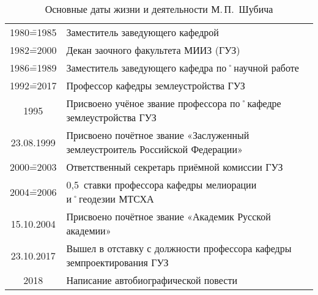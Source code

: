 \begin{table}[tH]
{\begin{tabularx}{\textwidth}{cX}
		1980\==1985		&	Заместитель заведующего кафедрой													\\
		1982\==2000		&	Декан заочного факультета МИИЗ (ГУЗ)												\\
		1986\==1989		&	Заместитель заведующего кафедра по˚научной работе									\\
		1992\==2017		&	Профессор кафедры землеустройства ГУЗ												\\
		1995				&	Присвоено учёное звание профессора по˚кафедре землеустройства ГУЗ					\\
		23.08.1999	&	Присвоено почётное звание «Заслуженный землеустроитель Российской Федерации»		\\
		2000\==2003		&	Ответственный секретарь приёмной комиссии ГУЗ										\\
		2004\==2006		&	0,5~ставки профессора кафедры мелиорации и˚геодезии МТСХА							\\
		15.10.2004	&	Присвоено почётное звание «Академик Русской академии»									\\
		23.10.2017	&	Вышел в отставку с должности профессора кафедры земпроектирования ГУЗ									\\
		2018				&	Написание автобиографической повести									\\
	\end{tabularx}
}
\caption{Основные даты жизни и деятельности М.\,П.~Шубича}
\label{tab:biograf}  
\end{table}

\clearpage